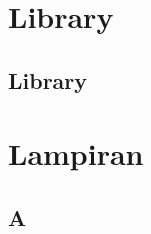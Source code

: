 \documentclass[11pt,b5paper,oneside,titlepage]{book}
\begin{document}
	\part{Library}
	\chapter{Library}\label{library}
	
	
	\appendix

	\backmatter
	\part{Lampiran}	

	\chapter{A}
	
	\printindex

\end{document}
